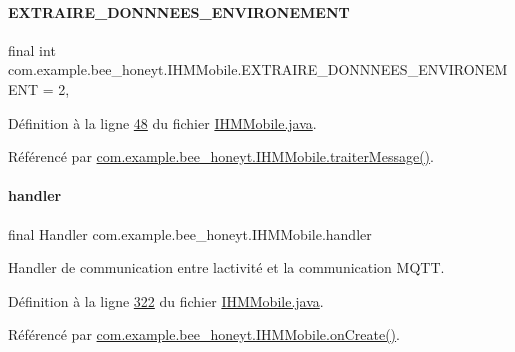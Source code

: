 \paragraph{\texorpdfstring{E\+X\+T\+R\+A\+I\+R\+E\+\_\+\+D\+O\+N\+N\+N\+E\+E\+S\+\_\+\+E\+N\+V\+I\+R\+O\+N\+E\+M\+E\+NT}{EXTRAIRE\_DONNNEES\_ENVIRONEMENT}}
{\footnotesize\ttfamily final int com.\+example.\+bee\+\_\+honeyt.\+I\+H\+M\+Mobile.\+E\+X\+T\+R\+A\+I\+R\+E\+\_\+\+D\+O\+N\+N\+N\+E\+E\+S\+\_\+\+E\+N\+V\+I\+R\+O\+N\+E\+M\+E\+NT = 2\hspace{0.3cm}{\ttfamily [static]}, {\ttfamily [private]}}



Définition à la ligne \hyperlink{_i_h_m_mobile_8java_source_l00048}{48} du fichier \hyperlink{_i_h_m_mobile_8java_source}{I\+H\+M\+Mobile.\+java}.



Référencé par \hyperlink{_i_h_m_mobile_8java_source_l00374}{com.\+example.\+bee\+\_\+honeyt.\+I\+H\+M\+Mobile.\+traiter\+Message()}.

\mbox{\label{classcom_1_1example_1_1bee__honeyt_1_1_i_h_m_mobile_ab04ad38c9ee9a2621cb1b10cc2da1df2}} 
\paragraph{\texorpdfstring{handler}{handler}}
{\footnotesize\ttfamily final Handler com.\+example.\+bee\+\_\+honeyt.\+I\+H\+M\+Mobile.\+handler\hspace{0.3cm}{\ttfamily [private]}}



Handler de communication entre l\textquotesingle{}activité et la communication M\+Q\+TT. 



Définition à la ligne \hyperlink{_i_h_m_mobile_8java_source_l00322}{322} du fichier \hyperlink{_i_h_m_mobile_8java_source}{I\+H\+M\+Mobile.\+java}.



Référencé par \hyperlink{_i_h_m_mobile_8java_source_l00078}{com.\+example.\+bee\+\_\+honeyt.\+I\+H\+M\+Mobile.\+on\+Create()}.

\mbox{\label{classcom_1_1example_1_1bee__honeyt_1_1_i_h_m_mobile_a7275bce8e0026b1043371e6878ff65c1}} 
